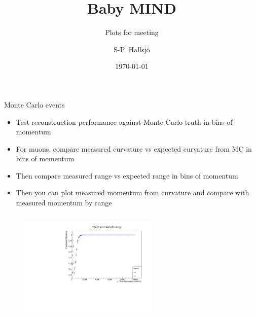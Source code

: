 \documentclass[11pt]{beamer}
\author{S-P. Hallsj{\"o}}
\date{}
\title{Baby MIND}
\subtitle{Plots for meeting}
\institute[U. of G.]{University of Glasgow}
\date{\today}
\begin{document}
	
	\beamertemplatenavigationsymbolsempty
	
	\begin{frame}[noframenumbering]
	\titlepage
\end{frame}

\begin{frame}{Monte Carlo events}
\begin{block}{}
	\begin{tiny}
	\begin{itemize}
		\item Test reconstruction performance against Monte Carlo truth in bins of momentum
		\item For muons, compare measured curvature vs expected curvature from MC in bins of momentum
		\item Then compare measured range vs expected range in bins of momentum
		\item Then you can plot measured momentum from curvature and compare with measured momentum by range
	\end{itemize}
\end{tiny}
\end{block}

\begin{columns}[T] %
	\begin{column}{.48\textwidth}

		\begin{figure}[h!]
			\centering
			\includegraphics[width=0.6\textwidth]{FittedMuonBeam.pdf}
			

\end{figure}
\end{column}
\end{columns}
\end{frame}
\end{document}
